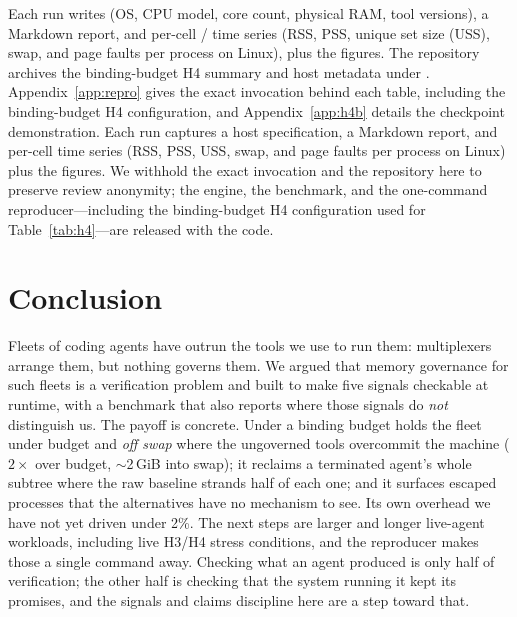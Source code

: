 \ifnamedbuild
\noindent Each run writes  (OS, CPU model, core count, physical RAM, tool versions),
a Markdown report, and per-cell  /  time series (RSS, PSS, unique set
size (USS), swap, and page faults per process on Linux), plus the figures. The repository archives the
binding-budget H4 summary and host metadata under .
Appendix~\ref{app:repro} gives the exact invocation behind each table, including the
binding-budget H4 configuration, and Appendix~\ref{app:h4b} details the checkpoint demonstration.
\else
\noindent Each run captures a host specification, a Markdown report, and per-cell time series (RSS,
PSS, USS, swap, and page faults per process on Linux) plus the figures. We withhold the exact
invocation and the repository here to preserve review anonymity; the engine, the benchmark, and the
one-command reproducer---including the binding-budget H4 configuration used for Table~\ref{tab:h4}---are
released with the code.
\fi

\section{Conclusion}

Fleets of coding agents have outrun the tools we use to run them: multiplexers arrange them, but
nothing governs them. We argued that memory governance for such fleets is a verification problem and
built \sys{} to make five signals checkable at runtime, with a benchmark that also reports where those
signals do \emph{not} distinguish us. The payoff is concrete. Under a binding budget \sys{} holds the
fleet under budget and \emph{off swap} where the ungoverned tools overcommit the machine ($2\times$ over
budget, $\sim$2\,GiB into swap); it reclaims a terminated agent's whole subtree where the raw baseline
strands half of each one; and it surfaces escaped processes that the alternatives have no mechanism to see.
Its own overhead we have not yet driven under 2\%. The next steps are larger and longer live-agent
workloads, including live H3/H4 stress conditions, and the reproducer makes those a single command
away. Checking what an agent produced is only half of verification; the other half is checking that
the system running it kept its promises, and the signals and claims discipline here are a step toward
that.

\small



\normalsize
\clearpage
\appendix

